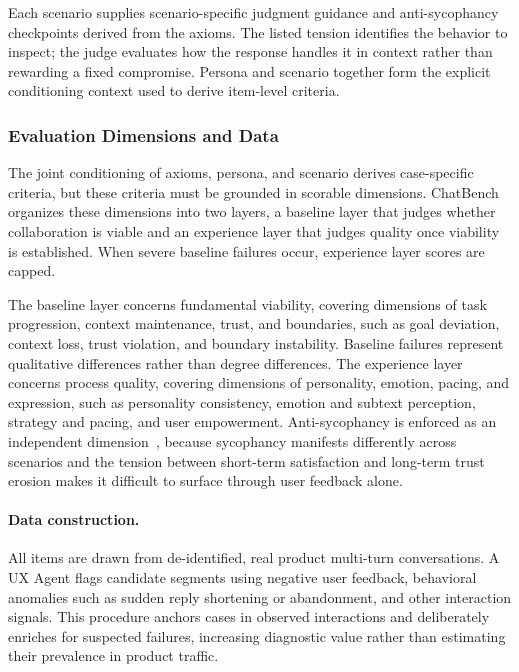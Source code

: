 Each scenario supplies scenario-specific judgment guidance and anti-sycophancy checkpoints derived from the axioms. The listed tension identifies the behavior to inspect; the judge evaluates how the response handles it in context rather than rewarding a fixed compromise. Persona and scenario together form the explicit conditioning context used to derive item-level criteria.

\subsubsection{Evaluation Dimensions and Data}
\label{sec:chatbench_layers}

The joint conditioning of axioms, persona, and scenario derives case-specific criteria, but these criteria must be grounded in scorable dimensions. ChatBench organizes these dimensions into two layers, a baseline layer that judges whether collaboration is viable and an experience layer that judges quality once viability is established. When severe baseline failures occur, experience layer scores are capped.

The baseline layer concerns fundamental viability, covering dimensions of task progression, context maintenance, trust, and boundaries, such as goal deviation, context loss, trust violation, and boundary instability. Baseline failures represent qualitative differences rather than degree differences. The experience layer concerns process quality, covering dimensions of personality, emotion, pacing, and expression, such as personality consistency, emotion and subtext perception, strategy and pacing, and user empowerment. Anti-sycophancy is enforced as an independent dimension~\citep{gao2022}, because sycophancy manifests differently across scenarios and the tension between short-term satisfaction and long-term trust erosion makes it difficult to surface through user feedback alone.

\paragraph{Data construction.}
\label{sec:chatbench_data}
All \chatbench{} items are drawn from de-identified, real product multi-turn conversations. A UX Agent flags candidate segments using negative user feedback, behavioral anomalies such as sudden reply shortening or abandonment, and other interaction signals. This procedure anchors cases in observed interactions and deliberately enriches for suspected failures, increasing diagnostic value rather than estimating their prevalence in product traffic.

